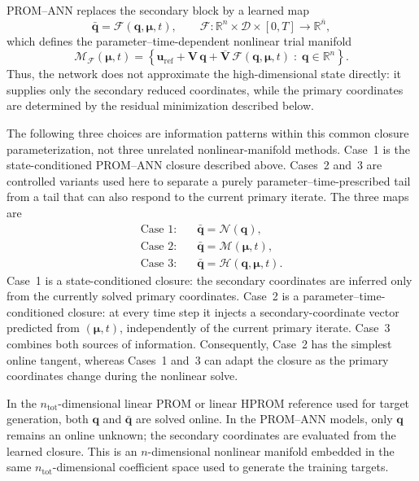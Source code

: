 \documentclass[11pt]{article}
\begin{document}
PROM--ANN replaces the secondary block by a learned map
\begin{equation}
\bar{\mathbf q}=
\mathcal F(\mathbf q,\bm\mu,t),
\qquad
\mathcal F:\mathbb R^n\times\mathcal D\times[0,T]
\longrightarrow\mathbb R^{\bar n},
\label{eq:closure-map}
\end{equation}
which defines the parameter--time-dependent nonlinear trial manifold
\begin{equation}
\mathcal M_{\mathcal F}(\bm\mu,t)
=
\left\{
\mathbf u_{\mathrm{ref}}+\mathbf V\,\mathbf q
+\overline{\mathbf V}\,\mathcal F(\mathbf q,\bm\mu,t)
\;:\;\mathbf q\in\mathbb R^n
\right\}.
\label{eq:ann-manifold}
\end{equation}
Thus, the network does not approximate the high-dimensional state directly:
it supplies only the secondary reduced coordinates, while the primary
coordinates are determined by the residual minimization described below.

The following three choices are information patterns within this common
closure parameterization, not three unrelated nonlinear-manifold methods.
Case~1 is the state-conditioned PROM--ANN closure described above.  Cases~2
and~3 are controlled variants used here to separate a purely
parameter--time-prescribed tail from a tail that can also respond to the
current primary iterate.  The three maps are
\begin{align}
\text{Case 1:}&\quad \bar{\mathbf q}=\mathcal N(\mathbf q),\\
\text{Case 2:}&\quad \bar{\mathbf q}=\mathcal M(\bm\mu,t),\\
\text{Case 3:}&\quad \bar{\mathbf q}=\mathcal H(\mathbf q,\bm\mu,t).
\end{align}
Case~1 is a state-conditioned closure: the secondary coordinates are inferred
only from the currently solved primary coordinates. Case~2 is a
parameter--time-conditioned closure: at every time step it injects a
secondary-coordinate vector predicted from $(\bm\mu,t)$, independently of
the current primary iterate. Case~3 combines both sources of information.
Consequently, Case~2 has the simplest online tangent, whereas Cases~1 and~3
can adapt the closure as the primary coordinates change during the nonlinear
solve.

In the $n_{\mathrm{tot}}$-dimensional linear PROM or linear HPROM reference
used for target generation, both $\mathbf q$ and $\bar{\mathbf q}$ are solved
online. In the PROM--ANN models, only $\mathbf q$ remains an online unknown;
the secondary coordinates are evaluated from the learned closure. This is an
$n$-dimensional nonlinear manifold embedded in the same
$n_{\mathrm{tot}}$-dimensional coefficient space used to generate the
training targets.
\end{document}
